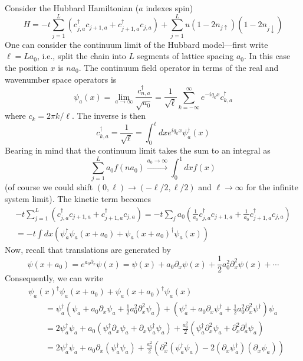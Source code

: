\documentclass{report}
\begin{document}
Consider the Hubbard Hamiltonian ($ a $ indexes spin)
\begin{equation*}
	H = -t \sum_{j = 1}^{L} (c_{j,a}^\dagger c_{j+1, a} + c_{j+1, a}^\dagger 
							c_{j,a})
			+ \sum_{j = 1}^{L} u(1-2n_{j\uparrow})(1-2n_{j\downarrow})
\end{equation*}
One can consider the continuum limit of the Hubbard model---first write 
$ \ell = L a_0 $, i.e., split the chain into $ L $ segments of lattice spacing 
$ a_0 $. In this case the position $ x $ is $ na_0 $. The continuum field
operator in terms of the real and wavenumber space operators is
\begin{equation*}
	\psi_a(x) = \lim_{a \rightarrow \infty}
		\frac{c_{n,a}^\dagger}{\sqrt{a_0}}
		= \frac{1}{\sqrt{\ell}}\sum_{k=-\infty}^\infty
			e^{-iq_k x}c_{k,a}^\dagger 
\end{equation*}
where $ c_k = 2\pi k/\ell $. The inverse is then 
\begin{equation*}
	c_{k,a}^\dagger = \frac{1}{\sqrt{\ell}}
		= \int_0^\ell dx e^{iq_k x} \psi_a^\dagger (x) 
\end{equation*}
Bearing in mind that the continuum limit takes the sum to an integral as 
\begin{equation*}
	\sum_{j=1}^L a_0 f(na_0)
		\xrightarrow{a_0 \to \infty}
		\int_0^1 dx f(x)
\end{equation*}
(of course we could shift $ (0, \ell) \to (-\ell/2, \ell/2) $ and $ \ell\to
\infty $ for the infinite system limit). The kinetic term becomes 
\begin{align*}
	-t \sum_{j=1}^L \left(
		c_{j,a}^\dagger c_{j+1, a} + c_{j+1, a}^\dagger c_{j,a}
	\right)
	= -t \sum_j a_0 
		\left( \frac{1}{a_0} c_{j,a}^\dagger c_{j+1, a} 
			+ \frac{1}{a_0} c_{j+1, a}^\dagger c_{j,a}\right)\\ 
	= - t \int dx (\psi_a^\dagger \psi_a(x + a_0) + \psi_a(x+a_0)^\dagger \psi_a(x))
\end{align*}
Now, recall that translations are generated by
\begin{equation*}
	\psi(x + a_0) = e^{a_0 \partial_x} \psi(x) 
		= \psi(x) + a_0 \partial_x \psi(x) + \frac{1}{2}a_0^2 \partial^2_x \psi(x) 
			+ \cdots 
\end{equation*}
Consequently, we can write 
\begin{align*}
	&\psi_a(x)^\dagger \psi_a(x + a_0) + \psi_a(x+a_0)^\dagger \psi_a(x)\\
	&\qquad= \psi_a ^\dagger \left(\psi_a + a_0\partial_x \psi_a 
		+ \frac{1}{2}a_0^2 \partial_x^2 \psi_a\right)
		+ \left(\psi_a^\dagger + a_0 \partial_x \psi_a^\dagger 
		+ \frac{1}{2}a_0^2 \partial_x^2 \psi^\dagger \right) \psi_a\\
	&\qquad= 2 \psi_a^\dagger \psi_a + a_0 \left(
		\psi_a^\dagger \partial_x \psi_a + \partial_x \psi_a^\dagger \psi_a
	\right)
		+ \frac{a_0^2}{2}\left(
			\psi_a^\dagger \partial_x^2 \psi_a + \partial_x^2 \partial_a^\dagger \psi_a
		\right)\\
	&\qquad =2  \psi_a^\dagger \psi_a + a_0 \partial_x(\psi_a^\dagger \psi_a)
		+ \frac{a_0^2}{2}\left(
			\partial_x^2(\psi_a^\dagger \psi_a) - 2(\partial_x \psi_a^\dagger)
			(\partial_x \psi_a)
		\right)
\end{align*}
\end{document}
